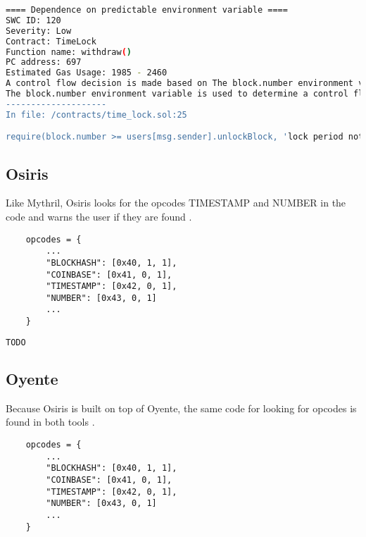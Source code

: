 \begin{lstlisting}[language=bash, caption="Mythril output for the time lock contract"]
==== Dependence on predictable environment variable ====
SWC ID: 120
Severity: Low
Contract: TimeLock
Function name: withdraw()
PC address: 697
Estimated Gas Usage: 1985 - 2460
A control flow decision is made based on The block.number environment variable.
The block.number environment variable is used to determine a control flow decision. Note that the values of variables like coinbase, gaslimit, block number and timestamp are predictable and can be manipulated by a malicious miner. Also keep in mind that attackers know hashes of earlier blocks. Don't use any of those environment variables as sources of randomness and be aware that use of these variables introduces a certain level of trust into miners.
--------------------
In file: /contracts/time_lock.sol:25

require(block.number >= users[msg.sender].unlockBlock, 'lock period not over')
\end{lstlisting}

\subsection{Osiris}
Like Mythril, Osiris looks for the opcodes TIMESTAMP and NUMBER in the code and warns the user if they are found \cite{osiris_opcodes}. \newline
\begin{lstlisting}
    opcodes = {
        ...
        "BLOCKHASH": [0x40, 1, 1],
        "COINBASE": [0x41, 0, 1],
        "TIMESTAMP": [0x42, 0, 1],
        "NUMBER": [0x43, 0, 1]
        ...
    }
\end{lstlisting}

\begin{lstlisting}[language=bash, caption="Osiris output for the time lock contract"]
    TODO
\end{lstlisting}

\subsection{Oyente}
Because Osiris is built on top of Oyente, the same code for looking for opcodes is found in both tools \cite{oyente_opcodes}. \newline

\begin{lstlisting}
    opcodes = {
        ...
        "BLOCKHASH": [0x40, 1, 1],
        "COINBASE": [0x41, 0, 1],
        "TIMESTAMP": [0x42, 0, 1],
        "NUMBER": [0x43, 0, 1]
        ...
    }
\end{lstlisting}

